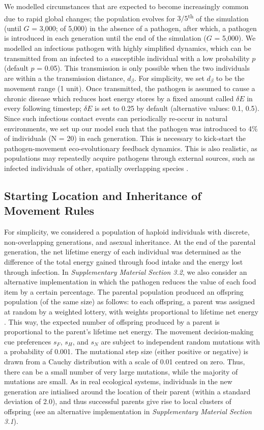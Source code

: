 We modelled circumstances that are expected to become increasingly common due to rapid global changes; the population evolves for $3/5$\textsuperscript{th} of the simulation (until $G$ = 3,000; of 5,000) in the absence of a pathogen, after which, a pathogen is introduced in each generation until the end of the simulation ($G$ = 5,000).
We modelled an infectious pathogen with highly simplified dynamics, which can be transmitted from an infected to a susceptible individual with a low probability $p$ (default $p$ = 0.05).
This transmission is only possible when the two individuals are within a the transmission distance, $d_\beta$.
For simplicity, we set $d_\beta$ to be the movement range (1 unit).
Once transmitted, the pathogen is assumed to cause a chronic disease which reduces host energy stores by a fixed amount called $\delta E$ in every following timestep; $\delta E$ is set to 0.25 by default (alternative values: 0.1, 0.5).
Since such infectious contact events can periodically re-occur in natural environments, we set up our model such that the pathogen was introduced to 4\% of individuals (N = 20) in each generation.
This is necessary to kick-start the pathogen-movement eco-evolutionary feedback dynamics.
This is also realistic, as populations may repeatedly acquire pathogens through external sources, such as infected individuals of other, spatially overlapping species \citep[e.g.][]{kuchipudi2022}.

\subsection*{Starting Location and Inheritance of Movement Rules}

For simplicity, we considered a population of haploid individuals with discrete, non-overlapping generations, and asexual inheritance.
At the end of the parental generation, the net lifetime energy of each individual was determined as the difference of the total energy gained through food intake and the energy lost through infection. 
In \textit{Supplementary Material Section 3.2}, we also consider an alternative implementation in which the pathogen reduces the value of each food item by a certain percentage.
The parental population produced an offspring population (of the same size) as follows: to each offspring, a parent was assigned at random by a weighted lottery, with weights proportional to lifetime net energy \citep{netz2021a, gupte2021a}.
This way, the expected number of offspring produced by a parent is proportional to the parent's lifetime net energy.
The movement decision-making cue preferences $s_F$, $s_H$, and $s_N$ are subject to independent random mutations with a probability of 0.001.
The mutational step size (either positive or negative) is drawn from a Cauchy distribution with a scale of 0.01 centred on zero.
Thus, there can be a small number of very large mutations, while the majority of mutations are small.
As in real ecological systems, individuals in the new generation are intialised around the location of their parent (within a standard deviation of 2.0), and thus successful parents give rise to local clusters of offspring (see an alternative implementation in \textit{Supplementary Material Section 3.1}).

